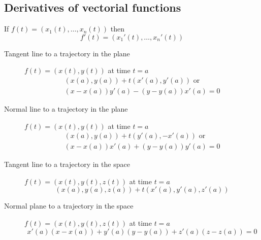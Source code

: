 \begin{multicols}{2}
\subsection*{Derivatives of vectorial functions}

	\begin{tcolorbox}[hbox, title=Derivative of a vectorial function]
		\begin{minipage}{0.4\textwidth}
			\flushleft
			If $f(t)=(x_1(t),\ldots, x_n(t))$ then
			\[
				f'(t)=(x_1'(t),\ldots, x_n'(t))
			\]
		\end{minipage}
	\end{tcolorbox}

	\begin{tcolorbox}[hbox, title=Tangent and normal lines in the plane]
		\begin{minipage}{0.4\textwidth}
			\flushleft
			\begin{description}
				\item[Tangent line to a trajectory in the plane] \mbox{$f(t)=(x(t),y(t))$} at time $t=a$				      
				\[
					\begin{array}{c}
						(x(a),y(a))+t(x'(a),y'(a)) \mbox{ or } \\
						(x-x(a))y'(a)-(y-y(a))x'(a)=0
					\end{array}      
				\]
				\item[Normal line to a trajectory in the plane] \mbox{$f(t)=(x(t),y(t))$} at time $t=a$
				\[
					\begin{array}{c}
						(x(a),y(a))+t(y'(a),-x'(a)) \mbox{ or }\\
						(x-x(a))x'(a)+(y-y(a))y'(a)=0
					\end{array}      
				\]
			\end{description}
		\end{minipage}
	\end{tcolorbox}

	\begin{tcolorbox}[hbox, title=Tangent line and normal plane in the space]
		\begin{minipage}{0.4\textwidth}
			\flushleft
			\begin{description}
				\item[Tangent line to a trajectory in the space] \mbox{$f(t)=(x(t),y(t),z(t))$} at time $t=a$
				      \[
					      (x(a),y(a),z(a))+t(x'(a),y'(a),z'(a))
				      \]
				\item[Normal plane to a trajectory in the space] \mbox{$f(t)=(x(t),y(t),z(t))$} at time $t=a$
				      \[
					      x'(a)(x-x(a))+y'(a)(y-y(a))+z'(a)(z-z(a))=0
				      \]
			\end{description}
		\end{minipage}
	\end{tcolorbox}




\end{multicols}

